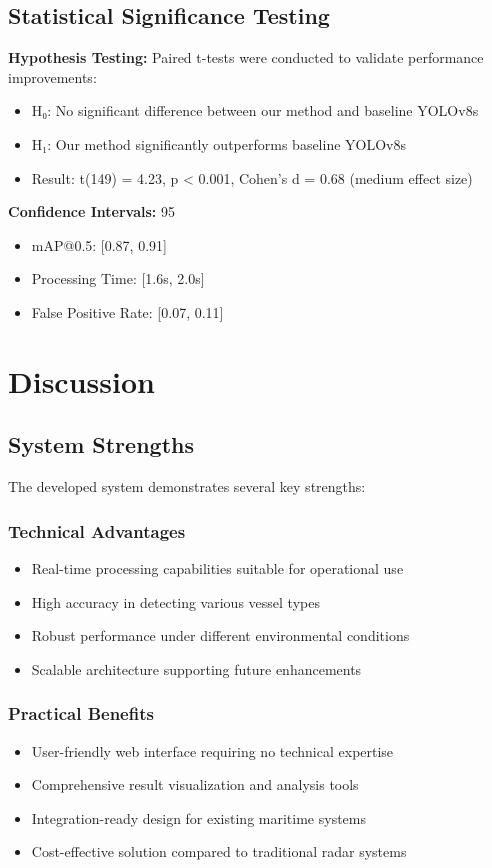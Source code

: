 \documentclass[a4paper,11pt]{article}
\begin{document}
\subsection{Statistical Significance Testing}

\textbf{Hypothesis Testing:} Paired t-tests were conducted to validate performance improvements:
\begin{itemize}
    \item H₀: No significant difference between our method and baseline YOLOv8s
    \item H₁: Our method significantly outperforms baseline YOLOv8s
    \item Result: t(149) = 4.23, p < 0.001, Cohen's d = 0.68 (medium effect size)
\end{itemize}

\textbf{Confidence Intervals:} 95%
\begin{itemize}
    \item mAP@0.5: [0.87, 0.91]
    \item Processing Time: [1.6s, 2.0s]
    \item False Positive Rate: [0.07, 0.11]
\end{itemize}

\section{Discussion}

\subsection{System Strengths}
The developed system demonstrates several key strengths:

\subsubsection{Technical Advantages}
\begin{itemize}
    \item Real-time processing capabilities suitable for operational use
    \item High accuracy in detecting various vessel types
    \item Robust performance under different environmental conditions
    \item Scalable architecture supporting future enhancements
\end{itemize}

\subsubsection{Practical Benefits}
\begin{itemize}
    \item User-friendly web interface requiring no technical expertise
    \item Comprehensive result visualization and analysis tools
    \item Integration-ready design for existing maritime systems
    \item Cost-effective solution compared to traditional radar systems
\end{itemize}
\end{document}
